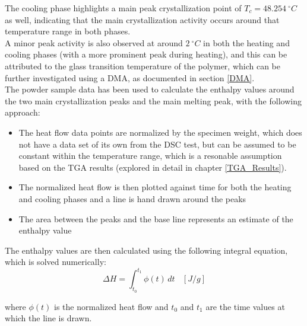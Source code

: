 \documentclass{article}
\begin{document}
        The cooling phase highlights a main peak crystallization point of $T_{c} =  48.254 \ ^{\circ}C$ as well, indicating 
        that the main crystallization activity occurs around that temperature range in both phases. \\ 

        A minor peak activity is also observed at around $2 \ ^{\circ}C$ in both the heating and cooling phases
        (with a more prominent peak during heating), and this can be attributed to the
        glass transition temperature of the polymer, which can be further investigated using a DMA, as documented in section \ref{DMA}. \\

        The powder sample data has been used to calculate the enthalpy values around the two main crystallization peaks and the main 
        melting peak, with the following approach: \\

        \begin{itemize}
            \item The heat flow data points are normalized by the specimen weight, which does not have a data set of its own from the DSC test, 
            but can be assumed to be constant within the temperature range, which is a resonable 
            assumption based on the TGA results (explored in detail in chapter \ref{TGA_Results}).
            \item The normalized heat flow is then plotted against time for both the heating and cooling phases and 
            a line is hand drawn around the peaks
            \item The area between the peaks and the base line represents an estimate of the enthalpy value  
        \end{itemize}

        The enthalpy values are then calculated using the following integral equation, which is solved numerically: \\ 

        \begin{equation}
            \Delta H = \int_{t_0}^{t_1} \phi (t) \,dt \ \ \ \ [J/g]
            \label{eq:enthalpy}
        \end{equation}

        where $\phi (t)$ is the normalized heat flow and $t_0$ and $t_1$ are the time values at which the line is drawn. 

        \clearpage
\end{document}
